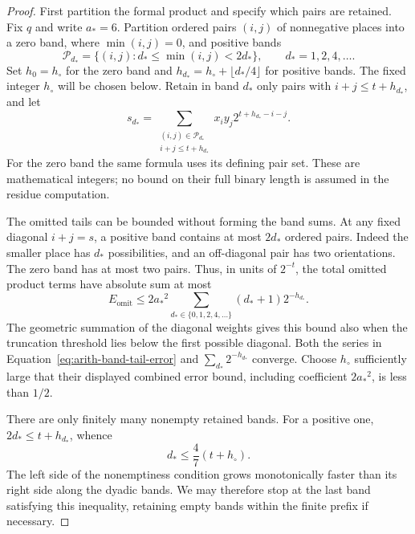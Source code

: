 \documentclass[11pt]{article}
\numberwithin{equation}{section}
\theoremstyle{definition}
\theoremstyle{remark}
\begin{document}
\begin{proof}
First partition the formal product and specify which pairs are retained. Fix $q$ and write ${a_*}=6$.  Partition ordered pairs $(i,j)$ of
nonnegative places into a zero band, where $\min(i,j)=0$, and
positive bands
\[
 \mathcal P_{d_*}=\{(i,j):{d_*}\leq\min(i,j)<2{d_*}\},
 \qquad {d_*}=1,2,4,\ldots.
\]
Set $h_0=h_\circ$ for the zero band and
$h_{d_*}=h_\circ+\lfloor {d_*}/4\rfloor$ for positive bands.  The fixed
integer $h_\circ$ will be chosen below.  Retain in band ${d_*}$ only
pairs with $i+j\leq t+h_{d_*}$, and let
\begin{equation}
 {s}_{d_*}=\sum_{\substack{(i,j)\in\mathcal P_{d_*}\\i+j\leq t+h_{d_*}}}
           x_i y_j2^{t+h_{d_*}-i-j}.
 \label{eq:arith-band-integer}
\end{equation}
For the zero band the same formula uses its defining pair set.
These are mathematical integers; no bound on their full binary
length is assumed in the residue computation.

The omitted tails can be bounded without forming the band sums. At any fixed diagonal $i+j=s$, a positive band contains at most
$2{d_*}$ ordered pairs.  Indeed the smaller place has ${d_*}$ possibilities,
and an off-diagonal pair has two orientations.  The zero band has
at most two pairs.  Thus, in units of $2^{-t}$, the total omitted
product terms have absolute sum at most
\begin{equation}
 E_{\mathrm{omit}}
 \leq 2{a_*}^2\sum_{{d_*}\in\{0,1,2,4,\ldots\}}({d_*}+1)2^{-h_{d_*}}.
 \label{eq:arith-band-tail-error}
\end{equation}
The geometric summation of the diagonal weights gives this bound
also when the truncation threshold lies below the first possible
diagonal.  Both the series in Equation~\eqref{eq:arith-band-tail-error}
and $\sum_{d_*}2^{-h_{d_*}}$ converge.  Choose $h_\circ$ sufficiently large
that their displayed combined error bound, including coefficient
$2{a_*}^2$, is less than $1/2$.

There are only finitely many nonempty retained bands.  For a
positive one, $2{d_*}\leq t+h_{d_*}$, whence
\begin{equation}
 {d_*}\leq\frac47(t+h_\circ).
 \label{eq:arith-last-band}
\end{equation}
The left side of the nonemptiness condition grows monotonically
faster than its right side along the dyadic bands.  We may therefore
stop at the last band satisfying this inequality, retaining empty
bands within the finite prefix if necessary.


\end{proof}
\end{document}
